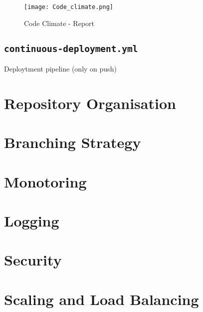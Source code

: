 \begin{figure}[H]
    \centering
    \texttt{[image: Code\_climate.png]}
    \caption{Code Climate - Report}
    \label{fig:my_label}
\end{figure}

\subsection{\texttt{continuous-deployment.yml}}
Deploytment pipeline (only on push)

\section{Repository Organisation}

\section{Branching Strategy}

\section{Monotoring}

\section{Logging}

\section{Security}

\section{Scaling and Load Balancing}